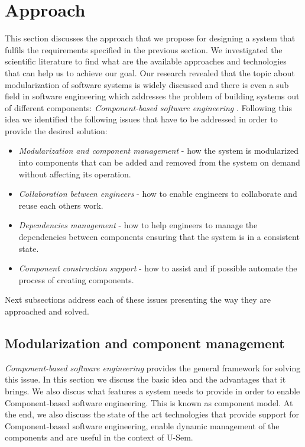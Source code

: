 \section{Approach}
\label{sec:approachPlugin}

This section discusses the approach that we propose for designing a system that fulfils the requirements specified in the previous section. We investigated the scientific literature to find what are the available approaches and technologies that can help us to achieve our goal. Our research revealed that the topic about modularization of software systems is widely discussed and there is even a sub field in software engineering which addresses the problem of building systems out of different components: \textit{Component-based software engineering}  \cite{jifeng2005component}. Following this idea we identified the following issues that have to be addressed in order to provide the desired solution:

\begin{itemize}
	\item \textit{Modularization and component management} - how the system is modularized into components that can be added and removed from the system on demand without affecting its operation.
	\item \textit{Collaboration between engineers} - how to enable engineers to collaborate and reuse each others work.
	\item \textit{Dependencies management} - how to help engineers to manage the dependencies between components ensuring that the system is in a consistent state.
	\item \textit{Component construction support} - how to assist and if possible automate the process of creating components.
\end{itemize}

Next subsections address each of these issues presenting the way they are approached and solved. 

\subsection{Modularization and component management}
\label{sec:pluginModulAndManag}

\textit{Component-based software engineering} provides the general framework for solving this issue. In this section we discuss the basic idea and the advantages that it brings. We also discus what features a system needs to provide in order to enable Component-based software engineering. This is known as component model. At the end, we also discuss the state of the art technologies that provide support for Component-based software engineering, enable dynamic management of the components and are useful in the context of U-Sem. 

